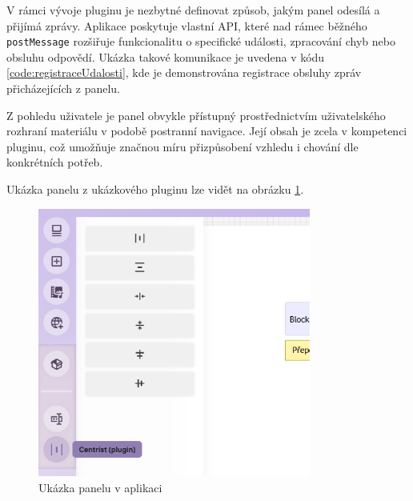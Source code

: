 V rámci vývoje pluginu je nezbytné definovat způsob, jakým panel odesílá a přijímá zprávy. 
Aplikace poskytuje vlastní API, které nad rámec běžného \texttt{postMessage} rozšiřuje funkcionalitu o specifické události, zpracování chyb nebo obsluhu odpovědí. 
Ukázka takové komunikace je uvedena v kódu \ref{code:registraceUdalosti}, kde je demonstrována registrace obsluhy zpráv přicházejících z panelu.

Z pohledu uživatele je panel obvykle přístupný prostřednictvím uživatelského rozhraní materiálu v podobě postranní navigace. 
Její obsah je zcela v kompetenci pluginu, což umožňuje značnou míru přizpůsobení vzhledu i chování dle konkrétních potřeb.

Ukázka panelu z ukázkového pluginu lze vidět na obrázku \ref{fig:realizace/panel}.




\begin{figure}[ht!]
    \centering
    \includegraphics[width=0.8\textwidth]{media/05_realizace/panel.png}
    \caption{Ukázka panelu v aplikaci}
    \label{fig:realizace/panel}
\end{figure}



